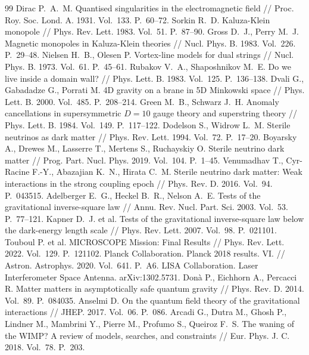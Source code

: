 \documentclass[11pt,letterpaper]{article}
\begin{document}
\begin{thebibliography}{99}
 Dirac P.~A.~M. Quantised singularities in the electromagnetic field // Proc. Roy. Soc. Lond. A. 1931. Vol.~133. P.~60--72.
 Sorkin R.~D. Kaluza-Klein monopole // Phys. Rev. Lett. 1983. Vol.~51. P.~87--90.
 Gross D.~J., Perry M.~J. Magnetic monopoles in Kaluza-Klein theories // Nucl. Phys. B. 1983. Vol.~226. P.~29--48.
 Nielsen H.~B., Olesen P. Vortex-line models for dual strings // Nucl. Phys. B. 1973. Vol.~61. P.~45--61.
 Rubakov V.~A., Shaposhnikov M.~E. Do we live inside a domain wall? // Phys. Lett. B. 1983. Vol.~125. P.~136--138.
 Dvali G., Gabadadze G., Porrati M. 4D gravity on a brane in 5D Minkowski space // Phys. Lett. B. 2000. Vol.~485. P.~208--214.
 Green M.~B., Schwarz J.~H. Anomaly cancellations in supersymmetric $D = 10$ gauge theory and superstring theory // Phys. Lett. B. 1984. Vol.~149. P.~117--122.
 Dodelson S., Widrow L.~M. Sterile neutrinos as dark matter // Phys. Rev. Lett. 1994. Vol.~72. P.~17--20.
 Boyarsky A., Drewes M., Lasserre T., Mertens S., Ruchayskiy O. Sterile neutrino dark matter // Prog. Part. Nucl. Phys. 2019. Vol.~104. P.~1--45.
 Venumadhav T., Cyr-Racine F.-Y., Abazajian K.~N., Hirata C.~M. Sterile neutrino dark matter: Weak interactions in the strong coupling epoch // Phys. Rev. D. 2016. Vol.~94. P.~043515.
 Adelberger E.~G., Heckel B.~R., Nelson A.~E. Tests of the gravitational inverse-square law // Annu. Rev. Nucl. Part. Sci. 2003. Vol.~53. P.~77--121.
 Kapner D.~J. et al. Tests of the gravitational inverse-square law below the dark-energy length scale // Phys. Rev. Lett. 2007. Vol.~98. P.~021101.
 Touboul P. et al. MICROSCOPE Mission: Final Results // Phys. Rev. Lett. 2022. Vol.~129. P.~121102.
 Planck Collaboration. Planck 2018 results. VI. // Astron. Astrophys. 2020. Vol.~641. P.~A6.
 LISA Collaboration. Laser Interferometer Space Antenna. arXiv:1302.5731.
 Donà P., Eichhorn A., Percacci R. Matter matters in asymptotically safe quantum gravity // Phys. Rev. D. 2014. Vol.~89. P.~084035.
 Anselmi D. On the quantum field theory of the gravitational interactions // JHEP. 2017. Vol.~06. P.~086.
 Arcadi G., Dutra M., Ghosh P., Lindner M., Mambrini Y., Pierre M., Profumo S., Queiroz F.~S. The waning of the WIMP? A review of models, searches, and constraints // Eur. Phys. J. C. 2018. Vol.~78. P.~203.
\end{thebibliography}
\end{document}
